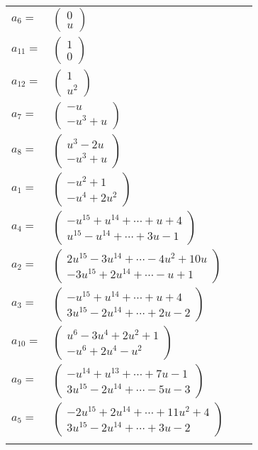 \documentclass[1p]{elsarticle_modified}
\theoremstyle{definition}
\begin{document}
\begin{tabular}{m{7pt} m{180pt} m{7pt} m{180pt} }
\flushright $a_{6}=$&$\begin{pmatrix}0\\u\end{pmatrix}$ \\
\flushright $a_{11}=$&$\begin{pmatrix}1\\0\end{pmatrix}$ \\
\flushright $a_{12}=$&$\begin{pmatrix}1\\u^2\end{pmatrix}$ \\
\flushright $a_{7}=$&$\begin{pmatrix}- u\\- u^3+u\end{pmatrix}$ \\
\flushright $a_{8}=$&$\begin{pmatrix}u^3-2 u\\- u^3+u\end{pmatrix}$ \\
\flushright $a_{1}=$&$\begin{pmatrix}- u^2+1\\- u^4+2 u^2\end{pmatrix}$ \\
\flushright $a_{4}=$&$\begin{pmatrix}- u^{15}+u^{14}+\cdots+u+4\\u^{15}- u^{14}+\cdots+3 u-1\end{pmatrix}$ \\
\flushright $a_{2}=$&$\begin{pmatrix}2 u^{15}-3 u^{14}+\cdots-4 u^2+10 u\\-3 u^{15}+2 u^{14}+\cdots- u+1\end{pmatrix}$ \\
\flushright $a_{3}=$&$\begin{pmatrix}- u^{15}+u^{14}+\cdots+u+4\\3 u^{15}-2 u^{14}+\cdots+2 u-2\end{pmatrix}$ \\
\flushright $a_{10}=$&$\begin{pmatrix}u^6-3 u^4+2 u^2+1\\- u^6+2 u^4- u^2\end{pmatrix}$ \\
\flushright $a_{9}=$&$\begin{pmatrix}- u^{14}+u^{13}+\cdots+7 u-1\\3 u^{15}-2 u^{14}+\cdots-5 u-3\end{pmatrix}$ \\
\flushright $a_{5}=$&$\begin{pmatrix}-2 u^{15}+2 u^{14}+\cdots+11 u^2+4\\3 u^{15}-2 u^{14}+\cdots+3 u-2\end{pmatrix}$\\&\end{tabular}
\end{document}
